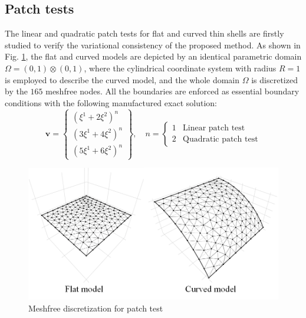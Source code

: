 \subsection{Patch tests}
The linear and quadratic patch tests for flat and curved thin shells are firstly studied to verify the variational consistency of the proposed method. As shown in Fig. \ref{ptf1}, the flat and curved models are depicted by an identical parametric domain $\Omega = (0,1)\otimes(0,1)$, where the cylindrical coordinate system with radius $R=1$ is employed to describe the curved model, and the whole domain $\Omega$ is discretized by the $165$ meshfree nodes. \DIFaddbegin {}\DIFaddend All the boundaries are enforced as essential boundary conditions with the following manufactured exact solution:
\begin{equation}
\boldsymbol v = \begin{Bmatrix}
(\xi^1+2\xi^2)^n \\ (3\xi^1+4\xi^2)^n \\ (5\xi^1+6\xi^2)^n
\end{Bmatrix},\quad
n = \begin{cases}
1 & \text{Linear patch test} \\
2 & \text{Quadratic patch test}
\end{cases}
\end{equation}

\begin{figure}[!ht]
    \centering
    \includegraphics[width=\textwidth]{figures/ptmsh}
    \caption{Meshfree discretization for patch test}\label{ptf1}
\end{figure}

